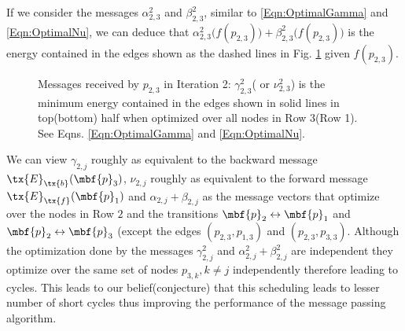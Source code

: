 \documentclass[journal, onecolumn]{IEEEtran}
\begin{document}
If we consider the messages $\alpha_{2,3}^{2}$ and $\beta_{2,3}^{2}$, similar to \eqref{Eqn:OptimalGamma} and \eqref{Eqn:OptimalNu}, we can deduce that $\alpha_{2,3}^{2}\big(f(p_{2,3})\big) +\beta_{2,3}^{2}\big(f(p_{2,3})\big)$ is the energy contained in the edges shown as the dashed lines in Fig. \ref{Fig:MP_Scheduling} given $f(p_{2,3}).$
\begin{figure}[h!]
\centering

\caption{Messages received by $p_{2,3}$ in Iteration 2: $\gamma_{2,3}^{2}$( or $\nu_{2,3}^{2}$) is the minimum energy contained in the edges shown in solid lines in top(bottom) half when optimized over all nodes in Row 3(Row 1). See Eqns. \eqref{Eqn:OptimalGamma} and \eqref{Eqn:OptimalNu}.}
\label{Fig:MP_Scheduling}
\end{figure}
We can view $\gamma_{2,j}$ roughly as equivalent to the backward message $\tx{E}_{\tx{b}}(\mbf{p}_{3})$, $\nu_{2,j}$ roughly as equivalent to the forward message $\tx{E}_{\tx{f}}(\mbf{p}_{1})$ and $\alpha_{2,j}+\beta_{2,j}$ as the message vectors that optimize over the nodes in Row $2$ and the transitions $\mbf{p}_{2}\leftrightarrow \mbf{p}_{1}$ and $\mbf{p}_{2}\leftrightarrow \mbf{p}_{3}$ (except the edges $(p_{2,3}, p_{1,3})$ and $(p_{2,3}, p_{3,3})$. Although the optimization done by the messages $\gamma^{2}_{2,j}$ and $\alpha^{2}_{2,j}+\beta^{2}_{2,j}$ are independent they optimize over the same set of nodes $p_{3,k},k\neq j$ independently therefore leading to cycles. This leads to our belief(conjecture) that this scheduling leads to lesser number of short cycles thus improving the performance of the message passing algorithm.
\end{document}
